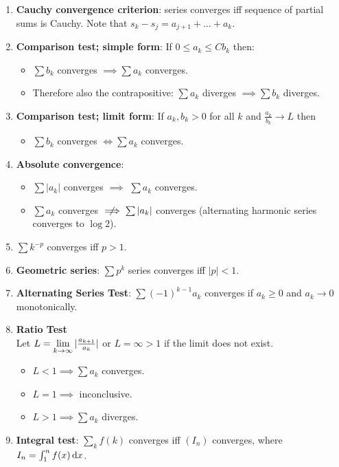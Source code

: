 \begin{theorem*}
\begin{enumerate}[label=(\roman*)]
  \item {\bf Cauchy convergence criterion}: series converges iff sequence of partial sums is
    Cauchy. Note that $s_k - s_j = a_{j+1} + \ldots + a_k$.
  \item {\bf Comparison test; simple form}: If $0 \leq a_k \leq Cb_k$ then:
    \begin{itemize}
    \item $\sum b_k$ converges $\implies \sum a_k$ converges.
    \item Therefore also the contrapositive: $\sum a_k$ diverges $\implies \sum b_k$ diverges.
    \end{itemize}
  \item {\bf Comparison test; limit form}: If $a_k, b_k > 0$ for all $k$ and
    $\frac{a_k}{b_k} \to L$ then
    \begin{itemize}
    \item $\sum b_k$ converges $\iff \sum a_k$ converges.
    \end{itemize}
  \item {\bf Absolute convergence}:
    \begin{itemize}
    \item $\sum |a_k|$ converges $\implies$ $\sum a_k$ converges.
    \item $\sum a_k$ converges $\nimplies \sum |a_k|$ converges (alternating harmonic series
      converges to $\log 2$).
    \end{itemize}
  \item $\sum k^{-p}$ converges iff $p > 1$.
  \item {\bf Geometric series}: $\sum p^k$ series converges iff $|p| < 1$.
  \item {\bf Alternating Series Test}: $\sum (-1)^{k-1}a_k$ converges if $a_k \geq 0$ and $a_k \to 0$
    monotonically.
  \item {\bf Ratio Test}\\
    Let $L = \limk |\frac{a_{k+1}}{a_k}|$ or $L = \infty > 1$ if the limit does not exist.
    \begin{itemize}
    \item $L < 1 \implies \sum a_k$ converges.
    \item $L = 1 \implies$ inconclusive.
    \item $L > 1 \implies \sum a_k$ diverges.
    \end{itemize}
  \item {\bf Integral test}: $\sum_k f(k)$ converges iff $(I_n)$ converges, where
    $I_n = \int_1^n f(x) \dx$.
  \end{enumerate}
\end{theorem*}



